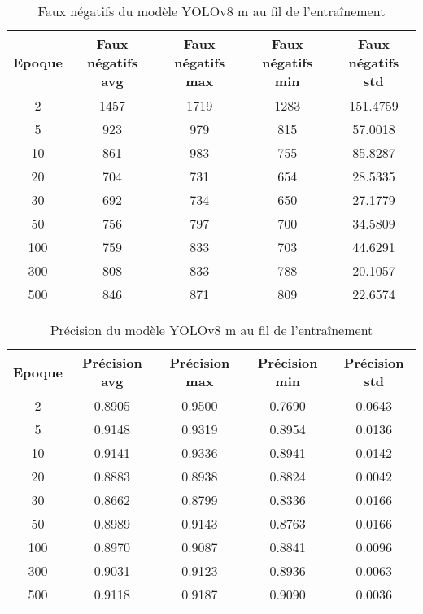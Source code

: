 \begin{table}[!ht]
    \caption{Faux négatifs du modèle YOLOv8 m au fil de l'entraînement}
    \label{tab:yolov8m_false_negative}
    \centering
    \begin{tabular}{ |c||c|c|c|c|  }
        \hline
        \rowcolor{gray!50}
        Epoque & Faux négatifs avg & Faux négatifs max & Faux négatifs min & Faux négatifs std\\
        \hline
        2 & 1457 & 1719 & 1283 & 151.4759\\
        5 & 923 & 979 & 815 & 57.0018\\
        10 & 861 & 983 & 755 & 85.8287\\
        20 & 704 & 731 & 654 & 28.5335\\
        30 & 692 & 734 & 650 & 27.1779\\
        50 & 756 & 797 & 700 & 34.5809\\
        100 & 759 & 833 & 703 & 44.6291\\
        300 & 808 & 833 & 788 & 20.1057\\
        500 & 846 & 871 & 809 & 22.6574\\
        \hline
    \end{tabular}
\end{table}

\begin{table}[!ht]
    \caption{Précision du modèle YOLOv8 m au fil de l'entraînement}
    \label{tab:yolov8m_precision}
    \centering
    \begin{tabular}{ |c||c|c|c|c|  }
        \hline
        \rowcolor{gray!50}
        Epoque & Précision avg & Précision max & Précision min & Précision std\\
        \hline
        2 & 0.8905 & 0.9500 & 0.7690 & 0.0643\\
        5 & 0.9148 & 0.9319 & 0.8954 & 0.0136\\
        10 & 0.9141 & 0.9336 & 0.8941 & 0.0142\\
        20 & 0.8883 & 0.8938 & 0.8824 & 0.0042\\
        30 & 0.8662 & 0.8799 & 0.8336 & 0.0166\\
        50 & 0.8989 & 0.9143 & 0.8763 & 0.0166\\
        100 & 0.8970 & 0.9087 & 0.8841 & 0.0096\\
        300 & 0.9031 & 0.9123 & 0.8936 & 0.0063\\
        500 & 0.9118 & 0.9187 & 0.9090 & 0.0036\\
        \hline
    \end{tabular}
\end{table}

